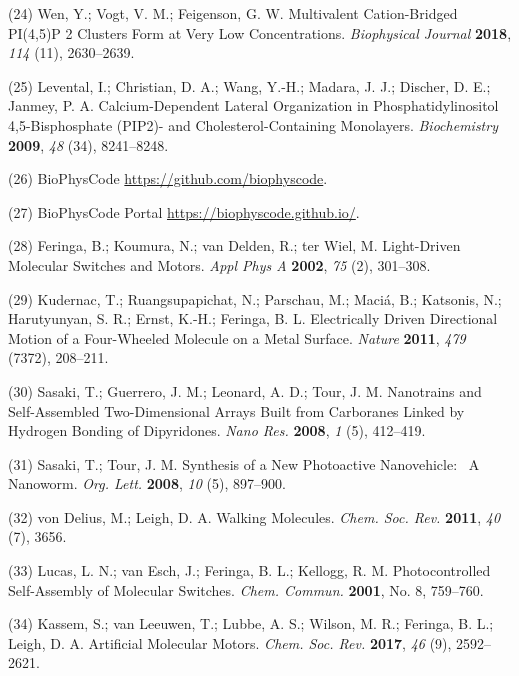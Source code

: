 \documentclass[11pt,notitlepage]{article}
\begin{document}
\leavevmode\hypertarget{ref-ior8wlwH}{}%
(24) Wen, Y.; Vogt, V. M.; Feigenson, G. W. Multivalent Cation-Bridged
PI(4,5)P 2 Clusters Form at Very Low Concentrations. \emph{Biophysical
Journal} \textbf{2018}, \emph{114} (11), 2630--2639.

\leavevmode\hypertarget{ref-JWXdIfNt}{}%
(25) Levental, I.; Christian, D. A.; Wang, Y.-H.; Madara, J. J.;
Discher, D. E.; Janmey, P. A. Calcium-Dependent Lateral Organization in
Phosphatidylinositol 4,5-Bisphosphate (PIP2)- and Cholesterol-Containing
Monolayers. \emph{Biochemistry} \textbf{2009}, \emph{48} (34),
8241--8248.

\leavevmode\hypertarget{ref-14RTQvTQS}{}%
(26) BioPhysCode \url{https://github.com/biophyscode}.

\leavevmode\hypertarget{ref-aHkuGDrS}{}%
(27) BioPhysCode Portal \url{https://biophyscode.github.io/}.

\leavevmode\hypertarget{ref-18PGyWtWV}{}%
(28) Feringa, B.; Koumura, N.; van Delden, R.; ter Wiel, M. Light-Driven
Molecular Switches and Motors. \emph{Appl Phys A} \textbf{2002},
\emph{75} (2), 301--308.

\leavevmode\hypertarget{ref-OAnfwOYX}{}%
(29) Kudernac, T.; Ruangsupapichat, N.; Parschau, M.; Maciá, B.;
Katsonis, N.; Harutyunyan, S. R.; Ernst, K.-H.; Feringa, B. L.
Electrically Driven Directional Motion of a Four-Wheeled Molecule on a
Metal Surface. \emph{Nature} \textbf{2011}, \emph{479} (7372), 208--211.

\leavevmode\hypertarget{ref-10MPrT2Vf}{}%
(30) Sasaki, T.; Guerrero, J. M.; Leonard, A. D.; Tour, J. M. Nanotrains
and Self-Assembled Two-Dimensional Arrays Built from Carboranes Linked
by Hydrogen Bonding of Dipyridones. \emph{Nano Res.} \textbf{2008},
\emph{1} (5), 412--419.

\leavevmode\hypertarget{ref-Tels98bO}{}%
(31) Sasaki, T.; Tour, J. M. Synthesis of a New Photoactive
Nanovehicle:~ A Nanoworm. \emph{Org. Lett.} \textbf{2008}, \emph{10}
(5), 897--900.

\leavevmode\hypertarget{ref-SfUEsk0e}{}%
(32) von Delius, M.; Leigh, D. A. Walking Molecules. \emph{Chem. Soc.
Rev.} \textbf{2011}, \emph{40} (7), 3656.

\leavevmode\hypertarget{ref-jCuccJLJ}{}%
(33) Lucas, L. N.; van Esch, J.; Feringa, B. L.; Kellogg, R. M.
Photocontrolled Self-Assembly of Molecular Switches. \emph{Chem.
Commun.} \textbf{2001}, No. 8, 759--760.

\leavevmode\hypertarget{ref-1H5r7SBir}{}%
(34) Kassem, S.; van Leeuwen, T.; Lubbe, A. S.; Wilson, M. R.; Feringa,
B. L.; Leigh, D. A. Artificial Molecular Motors. \emph{Chem. Soc. Rev.}
\textbf{2017}, \emph{46} (9), 2592--2621.
\end{document}

